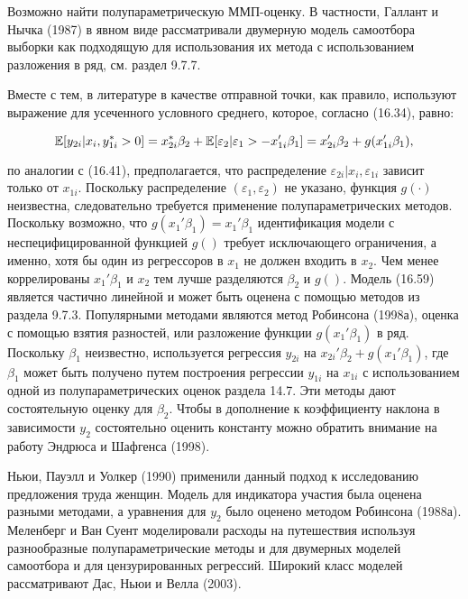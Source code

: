 Возможно найти полупараметрическую ММП-оценку. В частности, Галлант и Нычка (1987) в явном виде рассматривали  двумерную  модель самоотбора выборки как подходящую для использования их метода с использованием разложения в ряд, см. раздел 9.7.7.

Вместе с тем, в литературе в качестве отправной точки, как правило, используют выражение для усеченного условного среднего, которое, согласно (16.34), равно: 

\begin{equation}
\mathbb{E}[y_{2i}|x_i,y_{1i}^{*}>0]=x_{2i}^{*}\beta_2+\mathbb{E}[\varepsilon_2|\varepsilon_1>-x_{1i}'\beta_1]\\
=x_{2i}'\beta_2+g(x_{1i}'\beta_1),
\end{equation}

по аналогии с (16.41), предполагается, что распределение $\varepsilon_{2i}|x_i,\varepsilon_{1i}$ зависит только от $x_{1i}$. Поскольку распределение $(\varepsilon_1,\varepsilon_2)$ не указано,  функция $g(\cdot )$ неизвестна, следовательно требуется применение полупараметрических методов. Поскольку возможно, что $g(x_1'\beta_1)=x_1'\beta_1$ идентификация модели с неспецифицированной функцией $g()$ требует исключающего ограничения, а именно, хотя бы один из регрессоров в $x_1$ не должен входить в $x_2$. Чем менее коррелированы $x_1'\beta_1$ и $x_2$ тем лучше разделяются $\beta_2$ и $g()$. Модель (16.59) является частично линейной и может быть оценена с помощью методов из раздела 9.7.3. Популярными методами являются метод Робинсона (1998а), оценка с помощью взятия разностей, или разложение функции $g(x_1'\beta_1)$ в ряд. Поскольку $\beta_1$ неизвестно, используется регрессия $y_{2i}$ на $x_{2i}'\beta_2+g(x_1'\beta_1)$, где $\beta_1$ может быть получено путем построения регрессии $y_{1i}$ на $x_{1i}$ с использованием одной из полупараметрических оценок раздела 14.7. Эти методы дают состоятельную оценку для $\beta_2$. Чтобы в дополнение к коэффициенту наклона в зависимости $y_2$ состоятельно оценить константу можно обратить внимание на работу Эндрюса и Шафгенса (1998). 

Ньюи, Пауэлл и Уолкер (1990) применили данный подход к исследованию предложения труда женщин. Модель для индикатора участия была оценена разными методами, а уравнения для $y_2$ было оценено методом Робинсона (1988а). Меленберг и Ван Суент моделировали расходы на путешествия используя разнообразные полупараметрические методы и для двумерных моделей самоотбора и для цензурированных регрессий. Широкий класс моделей рассматривают Дас, Ньюи и Велла (2003).

